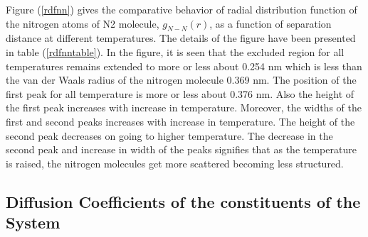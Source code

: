Figure (\ref {rdfnn}) gives the comparative behavior of radial distribution function of the nitrogen
atoms of N2 molecule, $g_{N-N} (r)$, as a function of separation distance at different temperatures. 
The details of the figure have been presented in table (\ref{rdfnntable}). In the
figure, it is seen that the excluded region for all temperatures remains extended to more or
less about 0.254 nm which is less than the van der Waals radius of the nitrogen molecule
0.369 nm. The position of the first peak for all temperature is more or less about 0.376
nm. Also the height of the first peak increases with increase in temperature. Moreover,
the widths of the first and second peaks increases with increase in temperature. The
height of the second peak decreases on going to higher temperature. The decrease in the
second peak and increase in width of the peaks signifies that as the temperature is raised,
the nitrogen molecules get more scattered becoming less structured.

\begin{table}[H]
\centering
\caption[ Details of the radial distribution function between nitrogen atoms of nitrogen molecule.]
{ Details of the radial distribution function between nitrogen atoms of nitrogen molecule  $g_{N-N} (r)$,   at different temperatures, from 293 K to 333 K. } 
\label{rdfnntable}
\end{table}
 
\subsection{Diffusion Coefficients of the constituents of the System }

